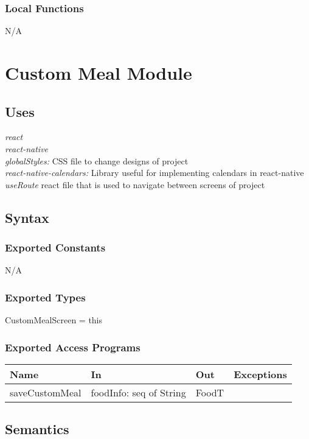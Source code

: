\documentclass[12pt, titlepage]{article}
\begin{document}
\subsubsection{Local Functions}

N/A

\section{Custom Meal Module} \label{Module} 

\subsection{Uses}
{\textit{react}}\\
{\textit{react-native}}\\
{\textit{globalStyles:} CSS file to change designs of project}\\
{\textit{react-native-calendars:} Library useful for implementing calendars in react-native}\\
{\textit{useRoute} react file that is used to navigate between screens of project}\\

\subsection{Syntax}

\subsubsection{Exported Constants}
N/A

\subsubsection{Exported Types}
CustomMealScreen = this

\subsubsection{Exported Access Programs}

\begin{tabular}{| l | l | l | l |}
	\hline
	{\textbf{Name}} & {\textbf{In}} & {\textbf{Out}} & {\textbf{Exceptions}}\\
	\hline
	{saveCustomMeal} &foodInfo: seq of String &FoodT & \\
	\hline
\end{tabular}

\subsection{Semantics}
\end{document}
